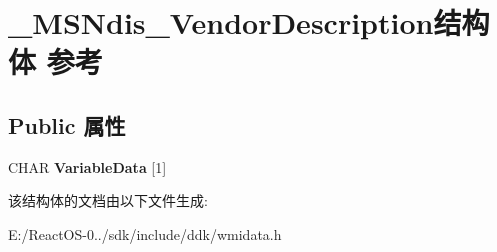 \hypertarget{struct___m_s_ndis___vendor_description}{}\section{\+\_\+\+M\+S\+Ndis\+\_\+\+Vendor\+Description结构体 参考}
\label{struct___m_s_ndis___vendor_description}
\subsection*{Public 属性}
\begin{DoxyCompactItemize}
\item 
\mbox{\label{struct___m_s_ndis___vendor_description_a3eed397214d614906ac933c06180f384}} 
C\+H\+AR {\bfseries Variable\+Data} \mbox{[}1\mbox{]}
\end{DoxyCompactItemize}


该结构体的文档由以下文件生成\+:\begin{DoxyCompactItemize}
\item 
E\+:/\+React\+O\+S-\/0../sdk/include/ddk/wmidata.\+h\end{DoxyCompactItemize}
